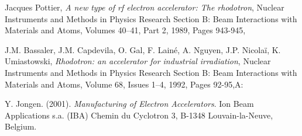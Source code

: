 \documentclass{article}
\begin{document}

\begin{thebibliography}{9}
    Jacques Pottier,
    \emph{A new type of rf electron accelerator: The rhodotron},
    Nuclear Instruments and Methods in Physics Research Section B: Beam Interactions with Materials and Atoms,
    Volumes 40–41, Part 2,
    1989,
    Pages 943-945,


    J.M. Bassaler, J.M. Capdevila, O. Gal, F. Lainé, A. Nguyen, J.P. Nicolaï, K. Umiastowski,
    \emph{Rhodotron: an accelerator for industrial irradiation},
    Nuclear Instruments and Methods in Physics Research Section B: Beam Interactions with Materials and Atoms,
    Volume 68, Issues 1–4,
    1992,
    Pages 92-95,A:

    Y. Jongen. (2001). \emph{Manufacturing of Electron Accelerators}. Ion Beam Applications s.a. (IBA) Chemin du Cyclotron 3, B-1348 Louvain-la-Neuve, Belgium.
\end{thebibliography}
\end{document}
